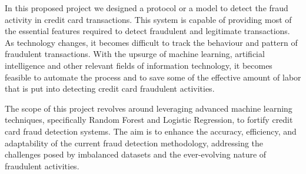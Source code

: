 In this proposed project we designed a protocol or a model
to detect the fraud activity in credit card transactions.
This system is capable of providing most of the essential
features required to detect fraudulent and legitimate
transactions. As technology changes, it becomes difficult to track the
behaviour and pattern of fraudulent transactions.
With the upsurge of machine learning, artificial intelligence
and other relevant fields of information technology, it
becomes feasible to automate the process and to save some
of the effective amount of labor that is put into detecting
credit card fraudulent activities.\medskip

The scope of this project revolves around leveraging advanced machine learning techniques, specifically Random Forest and Logistic Regression, to fortify credit card fraud detection systems. The aim is to enhance the accuracy, efficiency, and adaptability of the current fraud detection methodology, addressing the challenges posed by imbalanced datasets and the ever-evolving nature of fraudulent activities.
































